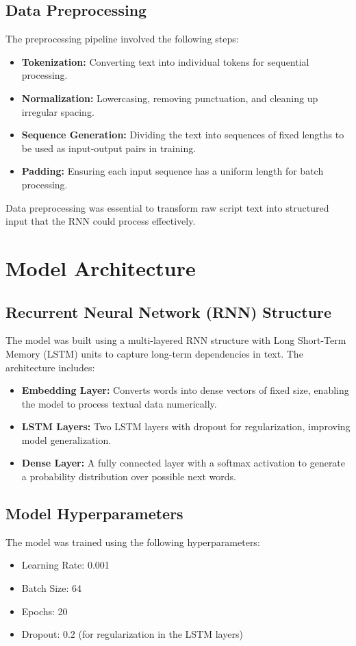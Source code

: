 \documentclass{article}
\begin{document}
\subsection{Data Preprocessing}
The preprocessing pipeline involved the following steps:
\begin{itemize}
    \item \textbf{Tokenization:} Converting text into individual tokens for sequential processing.
    \item \textbf{Normalization:} Lowercasing, removing punctuation, and cleaning up irregular spacing.
    \item \textbf{Sequence Generation:} Dividing the text into sequences of fixed lengths to be used as input-output pairs in training.
    \item \textbf{Padding:} Ensuring each input sequence has a uniform length for batch processing.
\end{itemize}
Data preprocessing was essential to transform raw script text into structured input that the RNN could process effectively.

\section{Model Architecture}
\subsection{Recurrent Neural Network (RNN) Structure}
The model was built using a multi-layered RNN structure with Long Short-Term Memory (LSTM) units to capture long-term dependencies in text. The architecture includes:
\begin{itemize}
    \item \textbf{Embedding Layer:} Converts words into dense vectors of fixed size, enabling the model to process textual data numerically.
    \item \textbf{LSTM Layers:} Two LSTM layers with dropout for regularization, improving model generalization.
    \item \textbf{Dense Layer:} A fully connected layer with a softmax activation to generate a probability distribution over possible next words.
\end{itemize}

\subsection{Model Hyperparameters}
The model was trained using the following hyperparameters:
\begin{itemize}
    \item Learning Rate: 0.001
    \item Batch Size: 64
    \item Epochs: 20
    \item Dropout: 0.2 (for regularization in the LSTM layers)
\end{itemize}
\end{document}
